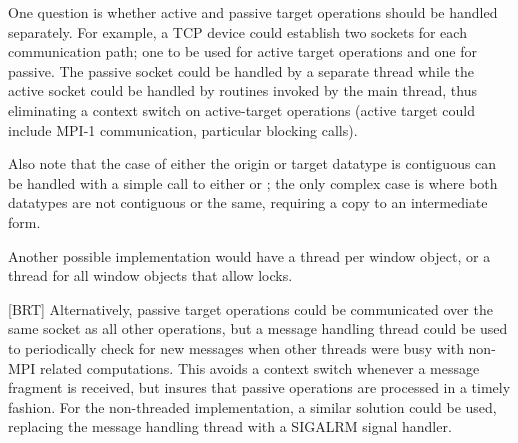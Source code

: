 \documentclass{article}
\begin{document}
One question is whether active and passive target operations should be handled
separately.  For example, a TCP device could establish two sockets for each
communication path; one to be used for active target operations and one for
passive.  The passive socket could be handled by a separate thread while the
active socket could be handled by routines invoked by the main thread, thus
eliminating a context switch on active-target operations (active target could
include MPI-1 communication, particular blocking calls).

Also note that the case of either the origin or target datatype is
contiguous can be handled with a simple call to either
 or ; the only complex case
is where both datatypes are not contiguous or the same, requiring a
copy to an intermediate form.

Another possible implementation would have a thread per window object,
or a thread for all window objects that allow locks.

[BRT] Alternatively, passive target operations could be communicated
over the same socket as all other operations, but a message handling
thread could be used to periodically check for new messages when other
threads were busy with non-MPI related computations.  This avoids a
context switch whenever a message fragment is received, but insures
that passive operations are processed in a timely fashion.  For the
non-threaded implementation, a similar solution could be used,
replacing the message handling thread with a SIGALRM signal handler.

\subsubsection{}


\end{document}
